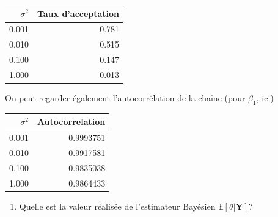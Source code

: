 \documentclass[]{article}
\newenvironment{Shaded}{\begin{snugshade}}{\end{snugshade}}
\newcommand{\CharTok}[1]{\textcolor[rgb]{0.31,0.60,0.02}{#1}}
\newcommand{\DataTypeTok}[1]{\textcolor[rgb]{0.13,0.29,0.53}{#1}}
\newcommand{\DecValTok}[1]{\textcolor[rgb]{0.00,0.00,0.81}{#1}}
\newcommand{\KeywordTok}[1]{\textcolor[rgb]{0.13,0.29,0.53}{\textbf{#1}}}
\newcommand{\NormalTok}[1]{#1}
\newcommand{\OperatorTok}[1]{\textcolor[rgb]{0.81,0.36,0.00}{\textbf{#1}}}
\newcommand{\StringTok}[1]{\textcolor[rgb]{0.31,0.60,0.02}{#1}}
\providecommand{\tightlist}{%
  \setlength{\itemsep}{0pt}\setlength{\parskip}{0pt}}
\newenvironment{Correction}%
  { \vspace{\baselineskip}\begin{mdframed}[backgroundcolor=my_green]}%
  {\end{mdframed}}
\begin{document}
\begin{longtable}[]{@{}rr@{}}
\toprule
\(\sigma^2\) & Taux d'acceptation\tabularnewline
\midrule
\endhead
0.001 & 0.781\tabularnewline
0.010 & 0.515\tabularnewline
0.100 & 0.147\tabularnewline
1.000 & 0.013\tabularnewline
\bottomrule
\end{longtable}

\begin{Correction}
On peut regarder également l'autocorrélation de la chaîne (pour $\beta_1$, ici)
\end{Correction}

\begin{Shaded}
\end{Shaded}

\begin{longtable}[]{@{}rr@{}}
\toprule
\(\sigma^2\) & Autocorrelation\tabularnewline
\midrule
\endhead
0.001 & 0.9993751\tabularnewline
0.010 & 0.9917581\tabularnewline
0.100 & 0.9835038\tabularnewline
1.000 & 0.9864433\tabularnewline
\bottomrule
\end{longtable}

\begin{enumerate}
\def\labelenumi{\arabic{enumi}.}
\setcounter{enumi}{4}
\tightlist
\item
  Quelle est la valeur réalisée de l'estimateur Bayésien
  \(\mathbb{E}[\theta \vert \mathbf{Y}]\)?
\end{enumerate}
\end{document}
